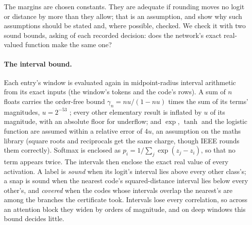 \documentclass[11pt]{article}
\newcommand{\pn}[2]{#2}
\theoremstyle{definition}
\begin{document}
The margins are chosen constants. They are adequate if rounding moves no logit or distance by more
than they allow; that is an assumption, and \citet{jia-2021-exploiting-verified-nn-floating-point}
show why such assumptions should be stated and, where possible, checked. We check it with two sound
bounds, asking of each recorded decision: does the network's exact real-valued function make the same
one?

\paragraph{The interval bound.} Each entry's window is evaluated again in midpoint-radius interval
arithmetic \citep{moore-1966-interval-analysis,rump-1999-fast-parallel-interval-arithmetic} from its exact inputs (the window's tokens and the
code's rows). A sum of $n$ floats carries the order-free bound $\gamma_n = nu/(1-nu)$ times the sum of
its terms' magnitudes, $u = 2^{-53}$ \citep[Chapters~3--4]{higham-2002-accuracy-stability-numerical-algorithms};
every other elementary result is inflated by $u$ of its magnitude, with an absolute floor for underflow;
and $\exp$, $\tanh$ and the logistic function are assumed within a relative error of
\pn{bound-ulps}{4}$u$, an assumption on the maths library (square roots and reciprocals get the same
charge, though IEEE rounds them correctly). Softmax is enclosed as $p_i = 1/\sum_j \exp(z_j - z_i)$, so that no term appears
twice. The intervals then enclose the exact real value of every activation. A label is \emph{sound}
when its logit's interval lies above every other class's; a snap is sound when the nearest code's
squared-distance interval lies below every other's, and \emph{covered} when the codes whose intervals
overlap the nearest's are among the branches the certificate took. Intervals lose every correlation,
so across an attention block they widen by orders of magnitude, and on deep windows this bound decides
little.
\end{document}
